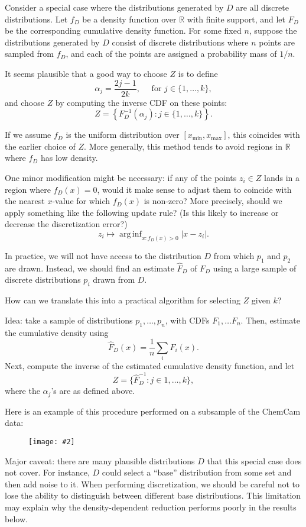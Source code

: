\documentclass[11pt]{article}
\newcommand{\quickFig}[2]{ %
  \begin{figure}[H] %
  \centering %
  \texttt{[image: \#2]} %
  \end{figure} %
}
\newcommand{\arginf}{\mathop{\mathrm{arg\,inf}}}
\newcommand{\abs}[1]{\left\lvert#1\right\rvert}
\newcommand{\xmin}{x_\mathrm{min}}
\newcommand{\xmax}{x_\mathrm{max}}
\theoremstyle{definition}
\begin{document}
Consider a special case where the distributions generated by $D$ are all discrete distributions.  Let $f_D$ be a density function over $\mathbb R$ with finite support, and let $F_D$ be the corresponding cumulative density function.  For some fixed $n$, suppose the distributions generated by $D$ consist of discrete distributions where $n$ points are sampled from $f_D$, and each of the points are assigned a probability mass of $1/n$.

It seems plausible that a good way to choose $Z$ is to define
\[ \alpha_j = \frac{2j-1}{2k}, \quad \text{ for } j \in \{1, \ldots, k \}, \]
and choose $Z$ by computing the inverse CDF on these points:
\[ Z = \left\{ F_D^{-1}(\alpha_j) : j \in \{ 1, \ldots, k \} \right\}. \]

If we assume $f_D$ is the uniform distribution over $[\xmin, \xmax]$, this coincides with the earlier choice of $Z$.  More generally, this method tends to avoid regions in $\mathbb R$ where $f_D$ has low density.

One minor modification might be necessary: if any of the points $z_i \in Z$ lands in a region where $f_D(x) = 0$, would it make sense to adjust them to coincide with the nearest $x$-value for which $f_D(x)$ is non-zero?  More precisely, should we apply something like the following update rule?  (Is this likely to increase or decrease the discretization error?)
\[ z_i \mapsto \arginf_{x : f_D(x) > 0} \abs{x-z_i}. \]

In practice, we will not have access to the distribution $D$ from which $p_1$ and $p_2$ are drawn.  Instead, we should find an estimate $\hat F_D$ of $F_D$ using a large sample of discrete distributions $p_i$ drawn from $D$.

How can we translate this into a practical algorithm for selecting $Z$ given $k$?

Idea: take a sample of distributions $p_1, \ldots, p_n$, with CDFs $F_1, \ldots F_n$.  Then, estimate the cumulative density using
\[ \hat F_D(x) = \frac1n \sum_i F_i(x). \]
Next, compute the inverse of the estimated cumulative density function, and let 
\[Z = \{ \hat F_D^{-1}: j \in 1, \ldots, k\},\]
where the $\alpha_j$'s are as defined above.

Here is an example of this procedure performed on a subsample of the ChemCam data:
\quickFig{0.6}{../dim_reduction/wavelengths_density_dependent.pdf}

Major caveat: there are many plausible distributions $D$ that this special case does not cover.  For instance, $D$ could select a ``base'' distribution from some set and then add noise to it.  When performing discretization, we should be careful not to lose the ability to distinguish between different base distributions.  This limitation may explain why the density-dependent reduction performs poorly in the results below.
\end{document}
